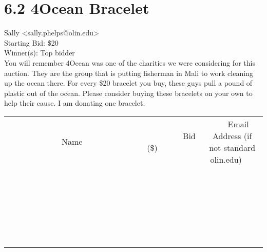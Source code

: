 \documentclass[11pt]{article}
\begin{document}
					\section*{6.2 4Ocean Bracelet}
					Sally <sally.phelps@olin.edu> \\
					Starting Bid: \$20 \\
					Winner(s): Top bidder \\
					You will remember 4Ocean was one of the charities we were considering for this auction.  They are the group that is putting fisherman in Mali to work cleaning up the ocean there.  For every \$20 bracelet you buy, these guys pull a pound of plastic out of the ocean.  Please consider buying these bracelets on your own to help their cause.  I am donating one bracelet. \\
					[6ex]
					\begin{tabular}{c c c}
						~~~~~~~~~~~~~Name~~~~~~~~~~~~~ & ~~~~~~~~~Bid (\$)~~~~~~~~~ & ~~~Email Address (if not standard olin.edu)~~~ \\
				
 & & \\
\hline
 & & \\
\hline
 & & \\
\hline
 & & \\
\hline
 & & \\
\hline
 & & \\
\hline
 & & \\
\hline
 & & \\
\hline
 & & \\
\hline
 & & \\
\hline
 & & \\
\hline
 & & \\
\hline
 & & \\
\hline
 & & \\
\hline
 & & \\
\hline
 & & \\
\hline
 & & \\
\hline
 & & \\
\hline
 & & \\
\hline
 & & \\
\hline
 & & \\
\hline
 & & \\
\hline
 & & \\
\hline
 & & \\
\hline
 & & \\
\hline
 & & \\
\hline
					\end{tabular}
					\clearpage
				
\end{document}
